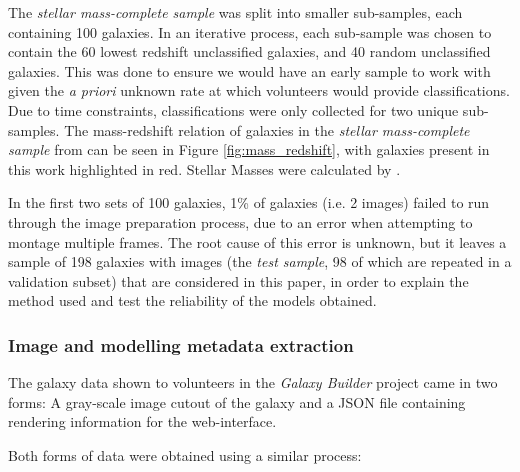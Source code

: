 \documentclass[main\.tex]{subfiles}
\begin{document}
The \textit{stellar mass-complete sample} was split into smaller sub-samples, each containing 100 galaxies. In an iterative process, each sub-sample was chosen to contain the 60 lowest redshift unclassified galaxies, and 40 random unclassified galaxies. This was done to ensure we would have an early sample to work with given the {\it a priori} unknown rate at which volunteers would provide classifications. Due to time constraints, classifications were only collected for two unique sub-samples. The mass-redshift relation of galaxies in the \textit{stellar mass-complete sample} from \citet{2017MNRAS.472.2263H} can be seen in Figure \ref{fig:mass_redshift}, with galaxies present in this work highlighted in red. Stellar Masses were calculated by \citet{2014ApJS..210....3M}.

\begin{figure*}
  \caption{Redshift against total galaxy stellar mass for all galaxies in the \textit{stellar mass-complete sample}, with the 198 galaxies considered in this paper highlighted in red. The distribution of stellar masses is shown in the right panel for the total sample and for the galaxies considered here. It is evident that the galaxies for which we collected classifications are not complete in stellar mass, but it is possible to select a further subset which would be.}
  \label{fig:mass_redshift}
\end{figure*}

In the first two sets of 100 galaxies, 1\% of galaxies (i.e. 2 images) failed to run through the image preparation process, due to an error when attempting to montage multiple frames. The root cause of this error is unknown, but it leaves a sample of 198 galaxies with images (the \textit{test sample}, 98 of which are repeated in a validation subset) that are considered in this paper, in order to explain the method used and test the reliability of the models obtained.

\subsubsection{Image and modelling metadata extraction}
\label{sec:image_creation}

The galaxy data shown to volunteers in the \textit{Galaxy Builder} project came in two forms: A gray-scale image cutout of the galaxy and a JSON file containing rendering information for the web-interface.

Both forms of data were obtained using a similar process:
\end{document}
